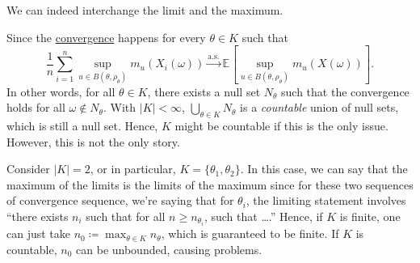 \begin{claim}
	We can indeed interchange the limit and the maximum.
\end{claim}
\begin{explanation}
	Since the \hyperref[def:converge-almost-surely]{convergence} happens for every \(\theta \in K\) such that
	\[
		\frac{1}{n} \sum_{i=1}^{n} \sup _{u \in B(\theta , \rho _\theta )} m_u(X_i(\omega ))
		\overset{\text{a.s.} }{\to} \mathbb{E}_{}\left[ \sup _{u \in B(\theta , \rho _\theta )} m_u(X(\omega )) \right].
	\]
	In other words, for all \(\theta \in K\), there exists a null set \(N_\theta \) such that the convergence holds for all \(\omega \notin N_\theta \). With \(\lvert K \rvert < \infty \), \(\bigcup_{\theta \in K} N_\theta \) is a \emph{countable} union of null sets, which is still a null set. Hence, \(K\) might be countable if this is the only issue. However, this is not the only story.

	Consider \(\lvert K \rvert = 2\), or in particular, \(K = \{ \theta _1, \theta _2 \} \). In this case, we can say that the maximum of the limits is the limits of the maximum since for these two sequences of convergence sequence, we're saying that for \(\theta _i\), the limiting statement involves ``there exists \(n_i\) such that for all \(n \geq n_{\theta _i}\), such that \dots.'' Hence, if \(K\) is finite, one can just take \(n_0 \coloneqq \max _{\theta \in K} n_{\theta }\), which is guaranteed to be finite. If \(K\) is countable, \(n_0\) can be unbounded, causing problems.
\end{explanation}

